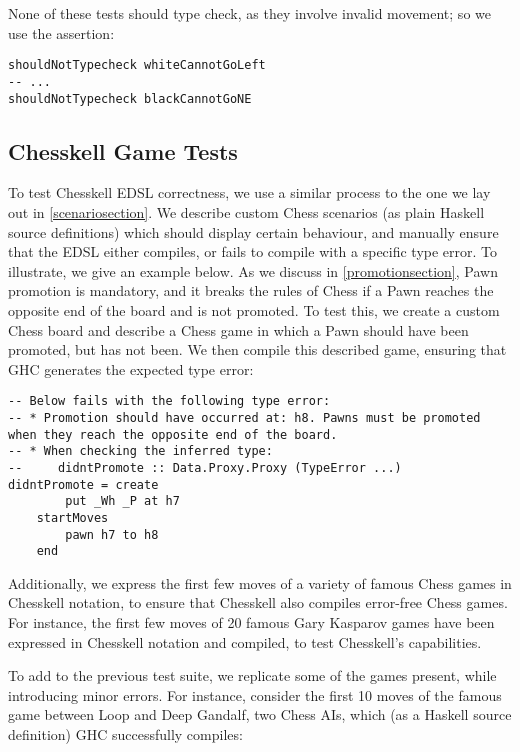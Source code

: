 None of these tests should type check, as they involve invalid movement; so we use the  assertion:

\begin{lstlisting}
shouldNotTypecheck whiteCannotGoLeft
-- ...
shouldNotTypecheck blackCannotGoNE
\end{lstlisting}

\subsection{Chesskell Game Tests} \label{gametestsection}

To test Chesskell EDSL correctness, we use a similar process to the one we lay out in \cref{scenariosection}. We describe custom Chess scenarios (as plain Haskell source definitions) which should display certain behaviour, and manually ensure that the EDSL either compiles, or fails to compile with a specific type error. To illustrate, we give an example below. As we discuss in \cref{promotionsection}, Pawn promotion is mandatory, and it breaks the rules of Chess if a Pawn reaches the opposite end of the board and is not promoted. To test this, we create a custom Chess board and describe a Chess game in which a Pawn should have been promoted, but has not been. We then compile this described game, ensuring that GHC generates the expected type error:

\begin{lstlisting}
-- Below fails with the following type error:
-- * Promotion should have occurred at: h8. Pawns must be promoted when they reach the opposite end of the board.
-- * When checking the inferred type:
--     didntPromote :: Data.Proxy.Proxy (TypeError ...)
didntPromote = create
        put _Wh _P at h7
    startMoves
        pawn h7 to h8
    end
\end{lstlisting}

Additionally, we express the first few moves of a variety of famous Chess games in Chesskell notation, to ensure that Chesskell also compiles error-free Chess games. For instance, the first few moves of 20 famous Gary Kasparov games have been expressed in Chesskell notation and compiled, to test Chesskell's capabilities.

To add to the previous test suite, we replicate some of the games present, while introducing minor errors. For instance, consider the first 10 moves of the famous game between Loop and Deep Gandalf, two Chess AIs, which (as a Haskell source definition) GHC successfully compiles:

